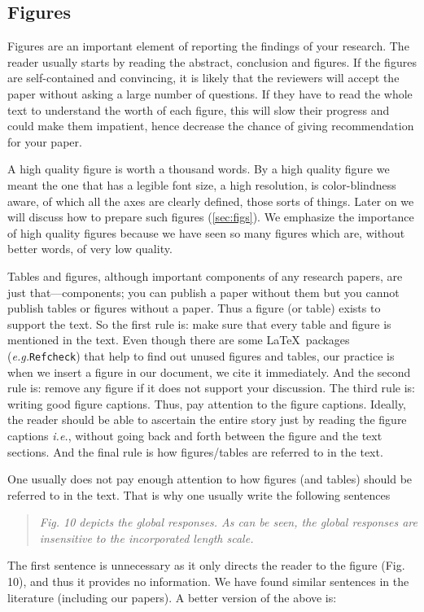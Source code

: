 \documentclass[authoryear,12pta4paper,fleqn]{article}
\newcommand{\eg}{\textit{e.g.}\xspace}
\newcommand{\ie}{\textit{i.e.},\xspace}
\numberwithin{equation}{section}
\theoremstyle{remark}
\begin{document}
\subsection{Figures}\label{sec:citing-figs}

Figures  are  an important element of reporting the findings of your research. The reader usually starts by reading the abstract, conclusion and figures. If the figures are self-contained and convincing, it is likely that the reviewers will accept the paper without asking a large number of questions. If they have to read the whole text to understand the worth of each figure, this will slow their progress and could make them impatient, hence decrease the chance of giving recommendation for your paper. 

A high quality figure is worth a thousand words. By a high quality figure we meant the one that has a legible font size, a high resolution, is color-blindness aware, of which all the axes are clearly defined, those sorts of things. Later on we will discuss how to prepare such figures (\cref{sec:figs}). We emphasize the importance of high quality figures because we have seen so many figures which are, without better words, of very low quality.

Tables and figures, although important components of any research papers, are just that—components; you can publish a paper without them but you cannot publish tables or figures without a paper. Thus a figure (or table) exists to support the text. So the first rule is: make sure that every table and figure is mentioned in the text. Even though there are some \LaTeX\ packages (\eg \texttt{Refcheck}) that help to find out unused figures and tables, our practice is when we insert a figure in our document, we cite it immediately. And the second rule is: remove any figure if it does not support your discussion. The third rule is: writing good figure captions. Thus, pay attention to the figure captions. Ideally, the reader should be able to ascertain the entire story just by reading the figure captions \ie without going back and forth between the figure and the text sections. And the final rule is how figures/tables are referred to in the text.

One usually does not pay enough attention to how figures (and tables) should be referred to in the text. That is why one usually write the following sentences

 \begin{quote}
  \textit{Fig. 10 depicts the global responses. As can be seen, the global responses are 
  insensitive to the incorporated length scale.}
 \end{quote}
The first sentence is unnecessary as it only directs the reader to the figure (Fig. 10), and thus it provides no information. We have found similar sentences in the literature (including our papers). A better version of the above is:
\end{document}
